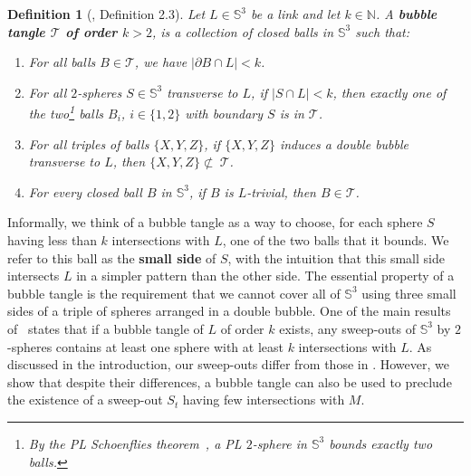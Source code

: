 \documentclass[10pt,a4paper]{amsart}
\newcommand{\Sp}{\mathbb{S}}
\newcommand{\T}{\mathcal{T}}
\newtheorem{definition}[theorem]{Definition}
\begin{document}
\begin{definition}[\cite{Lunel_spherewidth_out}, Definition 2.3]
\label{def:bubbletangle}
Let $L \in \Sp^3$ be a link and let $k \in \mathbb{N}$. A \textbf{bubble tangle $\T$ of order $k > 2$}, is a collection of closed balls in $\Sp^3$ such that: 
\begin{enumerate}[label = (T\arabic*)]
	\item \label{def_T1} For all balls $B \in \mathcal{T}$, we have $|\partial B \cap L| < k$.
	\item \label{def_T2} For all $2$-spheres $S \in \Sp^3$ transverse to $L$, if $|S \cap L| < k$, then exactly one of the two\footnote{By the PL Schoenflies theorem~\cite[Theorem~XIV.1]{bing}, a PL $2$-sphere in $\Sp^3$ bounds exactly two balls.} balls $B_i$, $i \in \{1, 2\}$ with boundary $S$ is in $\T$. 
	\item \label{def_T3} For all triples of balls $\{ X,Y,Z \}$, if $\{ X,Y,Z \}$ induces a double bubble transverse to $L$, then $\{ X,Y,Z \} \not \subset~\T$.  
	\item \label{def_T4} For every closed ball $B$ in $\Sp^3$, if $B$ is $L$-trivial, then $B \in \T$.
\end{enumerate}
\end{definition}

Informally, we think of a bubble tangle as a way to choose, for each sphere $S$ having less than $k$ intersections with $L$, one of the two balls that it bounds. We refer to this ball as the \textbf{small side} of $S$, with the intuition that this small side intersects $L$ in a simpler pattern than the other side. The essential property of a bubble tangle is the requirement that we cannot cover all of $\Sp^3$ using three small sides of a triple of spheres arranged in a double bubble. One of the main results of~\cite{Lunel_spherewidth_out} states that if a bubble tangle of $L$ of order $k$ exists, any sweep-outs of $\Sp^3$ by $2$-spheres contains at least one sphere with at least $k$ intersections with $L$. As discussed in the introduction, our sweep-outs differ from those in \cite{Lunel_spherewidth_out}. However, we show that despite their differences, a bubble tangle can also be used to preclude the existence of a sweep-out $S_t$ having few intersections with $M$.
\end{document}
